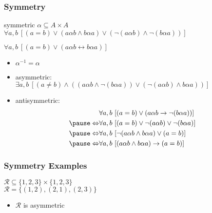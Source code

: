 \documentclass[dvipsnames]{beamer}
\begin{document}
\begin{frame}
  \frametitle{Symmetry}

  \begin{block}{symmetric}
    $\alpha \subseteq A \times A$\\
    $\forall a,b~[(a=b) \vee (a \alpha b \wedge b \alpha a)
                        \vee (\neg(a \alpha b) \wedge \neg(b \alpha a))]$

    \pause
    $\forall a,b~[(a=b) \vee (a \alpha b \leftrightarrow b \alpha a)]$
  \end{block}

  \pause
  \begin{itemize}
    \item $\alpha^{-1} = \alpha$

    \pause
    \item asymmetric:\\
      $\exists a,b~[(a \neq b) \wedge ((a \alpha b \wedge \neg(b \alpha a))
                               \vee (\neg (a \alpha b) \wedge b \alpha a))]$

    \pause
    \item antisymmetric:
    \vspace{-12pt}
    \begin{eqnarray*}
                      & \forall a,b~
                    [(a=b) \vee (a \alpha b \rightarrow \neg(b \alpha a))]\\\pause
      \Leftrightarrow & \forall a,b~
                    [(a=b) \vee \neg(a \alpha b) \vee \neg(b \alpha a)]\\\pause
      \Leftrightarrow & \forall a,b~
                    [\neg(a \alpha b \wedge b \alpha a) \vee (a=b)]\\\pause
      \Leftrightarrow & \forall a,b~
                    [(a \alpha b \wedge b \alpha a) \rightarrow (a=b)]
    \end{eqnarray*}
  \end{itemize}
\end{frame}

\begin{frame}
  \frametitle{Symmetry Examples}

  \begin{example}
    $\mathcal{R} \subseteq \{1,2,3\} \times \{1,2,3\}$\\
    $\mathcal{R} = \{(1,2), (2,1), (2,3)\}$

    \medskip
    \begin{itemize}
      \item $\mathcal{R}$ is asymmetric
    \end{itemize}
  \end{example}
\end{frame}
\end{document}
